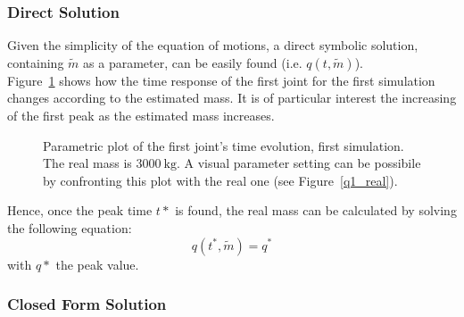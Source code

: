 \documentclass[a4paper,12pt,oneside]{report}
\begin{document}
\subsubsection{Direct Solution}
Given the simplicity of the equation of motions, a direct symbolic solution, containing $\tilde{m}$ as a parameter, can be easily found (i.e. $q(t,\tilde{m})$).\\
Figure~\ref{parametric_plot} shows how the time response of the first joint for the first simulation changes according to the estimated mass. It is of particular interest the increasing of the first peak as the estimated mass increases.\\
\begin{figure}[!b]
  \centering
  
  \caption{Parametric plot of the first joint's time evolution, first simulation. The real mass is $\SI{3000}{\kilogram}$. A visual parameter setting can be possibile by confronting this plot with the real one (see Figure~\ref{q1_real}).}
  \label{parametric_plot}
\end{figure}
Hence, once the peak time $t*$ is found, the real mass can be calculated by solving the following equation:
\begin{equation}
  q(t^*,\tilde{m})=q^*
\end{equation}
with $q*$ the peak value.
\subsubsection{Closed Form Solution}
\end{document}
